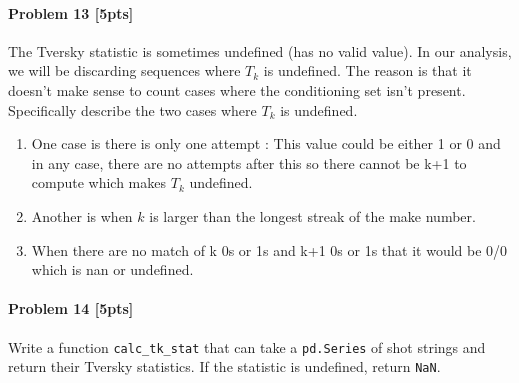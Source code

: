 \documentclass[11pt]{article}
\providecommand{\tightlist}{%
      \setlength{\itemsep}{0pt}\setlength{\parskip}{0pt}}
\begin{document}
\paragraph{Problem 13 {[}5pts{]}}\label{problem-13-5pts}

The Tversky statistic is sometimes undefined (has no valid value). In
our analysis, we will be discarding sequences where \(T_k\) is
undefined. The reason is that it doesn't make sense to count cases where
the conditioning set isn't present. Specifically describe the two cases
where \(T_k\) is undefined.

    \begin{enumerate}
\def\labelenumi{\arabic{enumi}.}
\tightlist
\item
  One case is there is only one attempt : This value could be either 1
  or 0 and in any case, there are no attempts after this so there cannot
  be k+1 to compute which makes \(T_k\) undefined.
\item
  Another is when \(k\) is larger than the longest streak of the make
  number.
\item
  When there are no match of k 0s or 1s and k+1 0s or 1s that it would
  be 0/0 which is nan or undefined.
\end{enumerate}

    \paragraph{Problem 14 {[}5pts{]}}\label{problem-14-5pts}

Write a function \texttt{calc\_tk\_stat} that can take a
\texttt{pd.Series} of shot strings and return their Tversky statistics.
If the statistic is undefined, return \texttt{NaN}.
\end{document}
